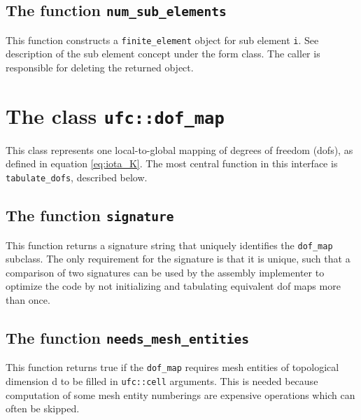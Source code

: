 
\subsection{The function \texttt{num\_sub\_elements}}
This function constructs a \texttt{finite\_element} object for sub element \texttt{i}.
See description of the sub element concept under the form class.
The caller is responsible for deleting the returned object.




\section{The class \texttt{ufc::dof\_map}}

This class represents one local-to-global mapping of degrees of freedom (dofs),
as defined in equation \eqref{eq:iota_K}.
The most central function in this interface is \texttt{tabulate\_dofs}, described below.






\subsection{The function \texttt{signature}}
This function returns a signature string that uniquely identifies the \texttt{dof\_map} subclass.
The only requirement for the signature is that it is unique, such
that a comparison of two signatures can be used by the assembly
implementer to optimize the code by not initializing and tabulating equivalent dof maps more than once.


\subsection{The function \texttt{needs\_mesh\_entities}}
This function returns true if the \texttt{dof\_map} requires mesh entities
of topological dimension d to be filled in \texttt{ufc::cell} arguments.
This is needed because computation of some mesh entity numberings
are expensive operations which can often be skipped.

